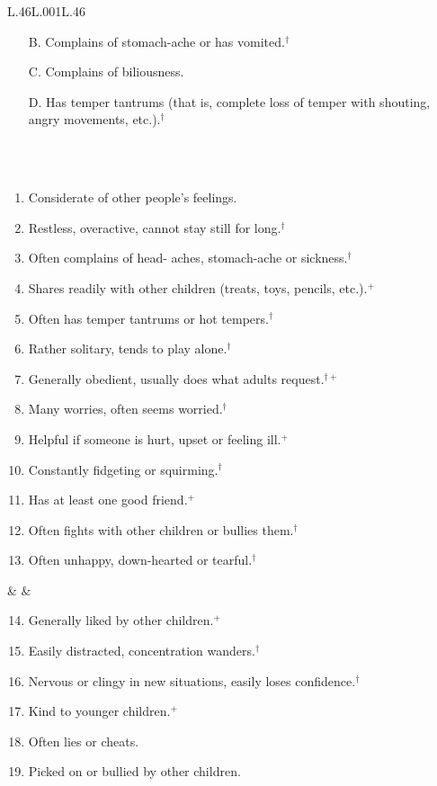 \begin{table}[ht!]
\begin{tabular}{L{.46\linewidth}L{.001\linewidth}L{.46\linewidth}}
\begin{enumerate}
\item[B.] Complains of stomach-ache or has vomited.$^\dagger$
\item[C.] Complains of biliousness.
\item[D.] Has temper tantrums (that is, complete loss of temper with shouting, angry movements, etc.).$^\dagger$
\end{enumerate}
\\
\midrule
{} \\[-1.8em]
\begin{enumerate}
\item Considerate of other people's feelings.
\item Restless, overactive, cannot stay still for long.$^\dagger$
\item Often complains of head- aches, stomach-ache or sickness.$^\dagger$
\item Shares readily with other children (treats, toys, pencils, etc.).$^+$
\item Often has temper tantrums or hot tempers.$^\dagger$
\item Rather solitary, tends to play alone.$^\dagger$
\item Generally obedient, usually does what adults request.$^{\dagger +}$
\item Many worries, often seems worried.$^\dagger$
\item Helpful if someone is hurt, upset or feeling ill.$^+$
\item Constantly fidgeting or squirming.$^\dagger$
\item Has at least one good friend.$^+$
\item Often fights with other children or bullies them.$^\dagger$
\item Often unhappy, down-hearted or tearful.$^\dagger$
\end{enumerate}
& &
\begin{enumerate}\setcounter{enumi}{13}
\item Generally liked by other children.$^+$
\item Easily distracted, concentration wanders.$^\dagger$
\item Nervous or clingy in new situations, easily loses confidence.$^\dagger$
\item Kind to younger children.$^+$
\item Often lies or cheats.
\item Picked on or bullied by other children.

\end{enumerate}
\end{tabular}
\end{table}

